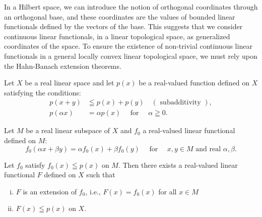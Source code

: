 \label{chap:IV}

In a Hilbert space, we can introduce the notion of orthogonal coordinates through an orthogonal base, and these coordinates are the values of bounded linear functionals defined by the vectors of the base. This suggests that we consider continuous linear functionals, in a linear topological space, as generalized coordinates of the space. To ensure the existence of non-trivial continuous linear functionals in a general locally convex linear topological space, we must rely upon the Hahn-Banach extension theorems. 


\label{sec:IV.1}

\begin{theoremu} Let $X$ be a real linear space and let $p(x)$ be a real-valued function defined on $X$ satisfying the conditions:
\begin{align}
p (x + y)& \leqq p (x) + p (y) \quad (\text{ subadditivity }), \label{eq:IV.1.1} \\
p (\alpha x)& = \alpha p (x) \quad \text{ for } \quad \alpha \geqq 0. \label{eq:IV.1.2}
\end{align}

Let $M$ be a real linear subspace of $X$ and $f_0$ a real-valued linear functional defined on $M$: 
\begin{equation}\label{eq:IV.1.3}
f _{0} (\alpha x + \beta y) = \alpha f _{0} (x) + \beta f _{0} (y) \quad \text{ for } \quad x, y \in M \text{ and real } \alpha , \beta .
\end{equation}

Let $f_0$ satisfy $f_0(x) \leqq p(x)$ on $M$. Then there exists a real-valued linear functional $F$ defined on $X$ such that \begin{enumerate}[i)]
\item $F$ is an extension of $f_0$, i.e., $F(x) = f_0(x)$ for all $x \in M$
\item $F(x) \leqq p(x)$ on $X$.
\end{enumerate}


\end{theoremu}
